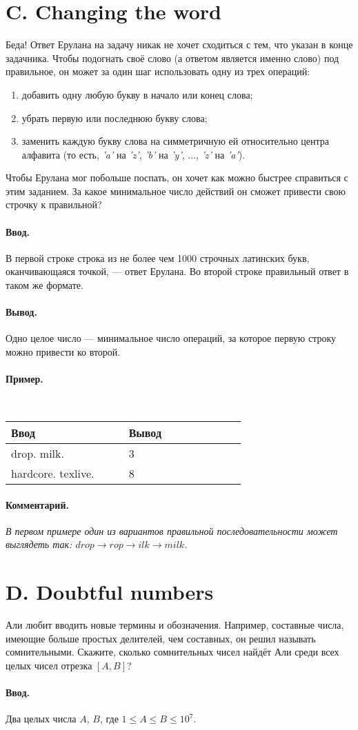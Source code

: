 \documentclass[10pt, a5paper]{article}
\newcommand{\informat}[1]
{
	\paragraph{Ввод.\\} #1
}
\newcommand{\outformat}[1]
{
	\paragraph{Вывод.\\} #1
}
\newcommand{\examplee}[4]
{
	\paragraph{Пример.\\}
	{\tt
	\begin{tabular}{|p{0.4\linewidth}|p{0.4\linewidth}|}
	\hline
	Ввод 	& Вывод  	\\
	\hline
	#1 		& #2 		\\
	\hline
	#3		& #4		\\
	\hline
	\end{tabular}
	}
}
\newcommand{\excomm}[1]
{
	\paragraph{Комментарий. \\}
	\textit{#1}
}
\begin{document}
\section*{C. Changing the word}

Беда! Ответ Ерулана на задачу никак не хочет сходиться с тем, что указан в конце задачника. Чтобы подогнать своё слово (а ответом является именно слово) под правильное, он может за один шаг использовать одну из трех операций:
\begin{enumerate}
\item добавить одну любую букву в начало или конец слова;
\item убрать первую или последнюю букву слова;
\item заменить каждую букву слова на симметричную ей относительно центра алфавита (то есть, \textit{'a'} на \textit{'z'}, \textit{'b'} на \textit{'y'}, $\dots$, \textit{'z'} на \textit{'a'}).
\end{enumerate}
Чтобы Ерулана мог побольше поспать, он хочет как можно быстрее справиться с этим заданием. За какое минимальное число действий он сможет привести свою строчку к правильной?

\informat{В первой строке строка из не более чем 1000 строчных латинских букв, оканчивающаяся точкой, --- ответ Ерулана. \newline 
Во второй строке правильный ответ в таком же формате.}

\outformat{Одно целое число --- минимальное число операций, за которое первую строку можно привести ко второй.}

\examplee{drop. \newline milk.}{3}{hardcore. \newline texlive.}{8}

\excomm{В первом примере один из вариантов правильной последовательности может выглядеть так: $drop \rightarrow rop \rightarrow ilk \rightarrow milk$.}



\section*{D. Doubtful numbers}

Али любит вводить новые термины и обозначения. Например, составные числа, имеющие больше простых делителей, чем составных, он решил называть сомнительными. Скажите, сколько сомнительных чисел найдёт Али среди всех целых чисел отрезка $[A, B]$?

\informat{Два целых числа $A$, $B$, где $1 \le A \le B \le 10^7$.}
\end{document}
